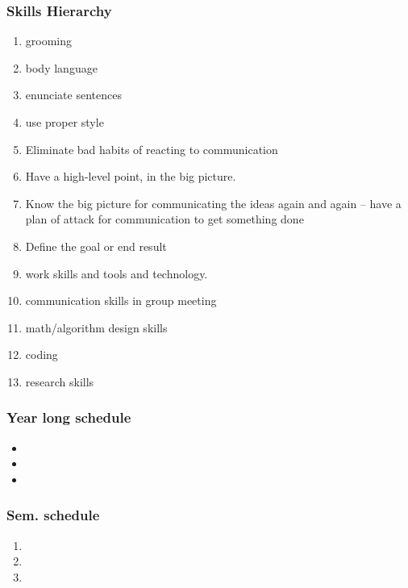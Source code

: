 \begin{frame}
\frametitle{ Skills Hierarchy }
\begin{enumerate}
\item grooming
\item body language
\item enunciate sentences
\item use proper style
\item Eliminate bad habits of reacting to communication
\item Have a high-level point, in the big picture.
\item Know the big picture for communicating the ideas again and again -- have a plan of attack for communication to get something done
\item Define the goal or end result
\item work skills and tools and technology.
\item communication skills in group meeting
\item math/algorithm design skills
\item coding
\item research skills
\end{enumerate}
\end{frame}


\begin{frame}
\frametitle{Year long schedule}
\begin{itemize}
\item
\item
\item
\end{itemize}
\end{frame}

\begin{frame}
\frametitle{Sem. schedule}
\begin{enumerate}
\item
\item
\item
\end{enumerate}
\end{frame}


